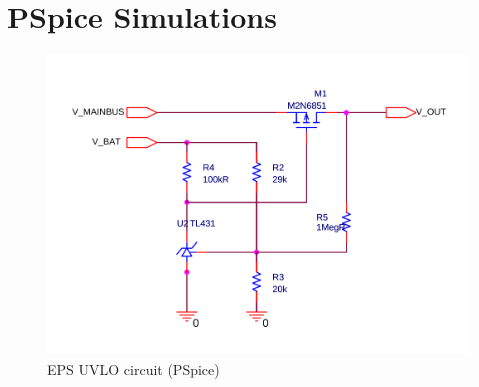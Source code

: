 \section{PSpice Simulations}
\label{app:EPS_PSpice}
%
%
\begin{figure}[H]
\centering
\includegraphics[scale=0.4]{figures/fig_CDR_PSpice_UVLO}
\caption{EPS UVLO circuit (PSpice)}
\label{fig:PSpice_UVLO}
\end{figure}

